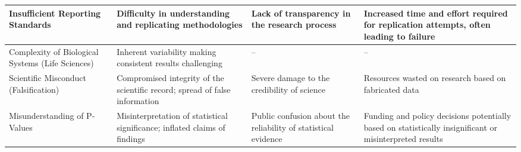 \documentclass{article}
\begin{document}
\begin{table}[ht]
\begin{tabularx}{\textwidth}{|X|X|X|X|}
        \hline
        Insufficient Reporting Standards                 & Difficulty in understanding and replicating methodologies                       & Lack of transparency in the research process                        & Increased time and effort required for replication attempts, often leading to failure                   \\
        \hline
        Complexity of Biological Systems (Life Sciences) & Inherent variability making consistent results challenging                      & --                                                                  & --                                                                                                      \\
        \hline
        Scientific Misconduct (Falsification)            & Compromised integrity of the scientific record; spread of false information     & Severe damage to the credibility of science                         & Resources wasted on research based on fabricated data                                                   \\
        \hline
        Misunderstanding of P-Values                     & Misinterpretation of statistical significance; inflated claims of findings      & Public confusion about the reliability of statistical evidence      & Funding and policy decisions potentially based on statistically insignificant or misinterpreted results \\
        \hline
    \end{tabularx}
\end{table}
\end{document}
